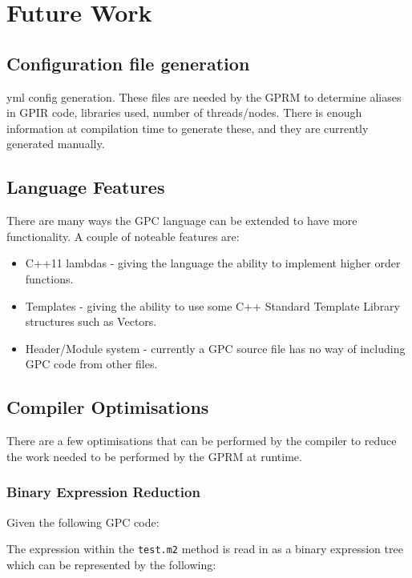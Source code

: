 \chapter{Future Work}
\label{ch:future}

\section{Configuration file generation}
    yml config generation.
    These files are needed by the GPRM to determine aliases in GPIR code, libraries used,
    number of threads/nodes. There is enough information at compilation time to generate these,
    and they are currently generated manually. 


\section{Language Features}
    There are many ways the GPC language can be extended to have more
    functionality. A couple of noteable features are:
    \begin{itemize}
        \item C++11 lambdas - giving the language the ability to implement higher order functions.
        \item Templates - giving the ability to use some C++ Standard Template Library structures such as Vectors.
        \item Header/Module system - currently a GPC source file has no way of including GPC code
    from other files.

    \end{itemize} 

\section{Compiler Optimisations}

    There are a few optimisations that can be performed by the compiler to reduce the work needed to be 
    performed by the GPRM at runtime.

\subsection{Binary Expression Reduction}
Given the following GPC code:    



The expression within the \texttt{test.m2} method is read in as a binary expression
tree which can be represented by the following:

